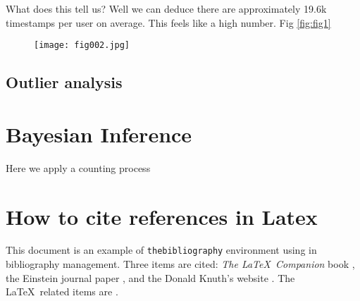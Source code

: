 What does this tell us? Well we can deduce there are approximately 19.6k timestamps per user on average. This feels like a high number. Fig \ref{fig:fig1}

\begin{figure}[h!]
	\centering
	\texttt{[image: fig002.jpg]}
	\caption{}
	\label{fig:fig2}
\end{figure} 


\subsection{Outlier analysis} 


\section{Bayesian Inference}

Here we apply a counting process


\section{How to cite references in Latex}
\parencite{Reference1}

\medskip

This document is an example of \texttt{thebibliography} environment using 
in bibliography management. Three items are cited: \textit{The \LaTeX\ Companion} 
book \cite{latexcompanion}, the Einstein journal paper \cite{einstein}, and the 
Donald Knuth's website \cite{knuthwebsite}. The \LaTeX\ related items are
\cite{latexcompanion,knuthwebsite}. 

\medskip
